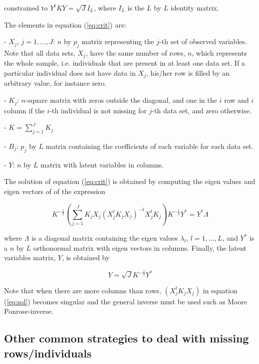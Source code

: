 \documentclass[article]{jss}
\begin{document}
constrained to $Y^t K Y = \sqrt{J} I_L$,  where $I_L$ is the $L$ by $L$ identity matrix.


The elements in equation (\ref{eq:crit}) are:

- $X_j$, $j=1,\ldots,J$: $n$ by $p_j$ matrix representing the $j$-th set of observed variables. Note that all data sets, $X_j$, have the same number of rows, $n$, which represents the whole sample, i.e. individuals that are present in at least one data set. If a particular individual does not have data in $X_j$, his/her row is filled by an arbitrary value, for instance zero.

- $K_j$: $n$-square matrix with zeros outside the diagonal, and one in the $i$ row and $i$ column if the $i$-th individual is not missing for $j$-th data set, and zero otherwise.

- $K = \sum_{j=1}^J K_j$

- $B_j$: $p_j$ by $L$ matrix containing the coefficients of each variable for each data set.

- $Y$: $n$ by $L$ matrix with latent variables in columns.


The solution of equation (\ref{eq:crit}) is obtained by computing the eigen values and eigen vectors of  of the expression


\begin{equation} \label{eq:sol}
K^{-\frac{1}{2}} \left(\sum_{j=1}^J K_j X_j \left(X_j^t K_j X_j \right)^{-1} X_j^t K_j \right) K^{-\frac{1}{2}} Y^{*} = Y^{*} \Lambda
\end{equation}

where $\Lambda$ is a diagonal matrix containing the eigen values $\lambda_l$, $l=1,\ldots,L$, and $Y^{*}$ is a $n$ by $L$ orthonormal matrix with eigen vectors in columns. Finally, the latent variables matrix, $Y$, is obtained by 

\begin{equation} \label{eq:latent}
Y=\sqrt{J} K^{-\frac{1}{2}} Y^{*}
\end{equation}

Note that when there are more columns than rows, $\left(X_j^t K_j X_j \right)$ in equation (\ref{eq:sol}) becomes singular and the general inverse must be used such as Moore Ponrose-inverse.


\subsection{Other common strategies to deal with missing rows/individuals} 
\end{document}
